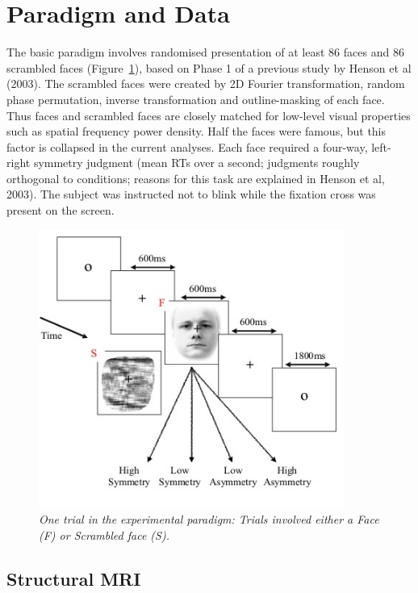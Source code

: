 \section{Paradigm and Data}

The basic paradigm involves randomised presentation of at least 86 faces and 86 scrambled faces (Figure~\ref{multimodal:fig:1}), based on Phase 1 of a previous study by Henson et al (2003). The scrambled faces were created by 2D Fourier transformation, random phase permutation, inverse transformation and outline-masking of each face. Thus faces and scrambled faces are closely matched for low-level visual properties such as spatial frequency power density. Half the faces were famous, but this factor is collapsed in the current analyses. Each face required a four-way, left-right symmetry judgment (mean RTs over a second; judgments roughly orthogonal to conditions; reasons for this task are explained in Henson et al, 2003). The subject was instructed not to blink while the fixation cross was present on the screen.

\begin{figure}
\begin{center}
\includegraphics[width=100mm]{multimodal/figures/paradigm}
\caption{\em One trial in the experimental paradigm: Trials involved either a Face (F) or Scrambled face (S). \label{multimodal:fig:1}}
\end{center}
\end{figure}

\subsection{Structural MRI}

